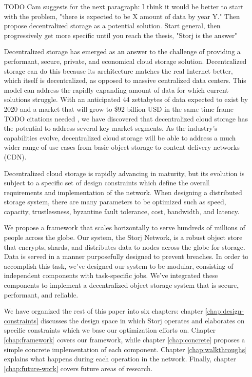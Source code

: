 \documentclass[11pt,fleqn,openany]{book}
\newcommand{\todo}[1]{{\color{red} TODO #1 }}
\begin{document}
\todo{Cam suggests for the next paragraph:
I think it would be better to start with the problem, "there is expected to be X amount of data by year Y." Then propose decentralized storage as a potential solution. Start general, then progressively get more specific until you reach the thesis, "Storj is the answer"
}

Decentralized storage has emerged as an answer to the challenge of
providing a performant, secure, private, and economical cloud storage solution.
Decentralized storage can do this because its architecture matches the real
Internet better, which itself is decentralized, as opposed to massive
centralized data centers. This model can address the rapidly
expanding amount of data for which current solutions struggle.
With an anticipated 44 zettabytes of data expected to exist by 2020 and a
market that will grow to \$92 billion USD in the same time frame
\todo{citations needed}, we have discovered that decentralized cloud storage
has the potential to address several key market segments.
As the industry's capabilities evolve, decentralized cloud
storage will be able to address a much wider range of use cases from basic
object storage to content delivery networks (CDN).

Decentralized cloud storage is rapidly advancing in maturity, but its evolution
is subject to a specific set of design constraints which
define the overall requirements and implementation of
the network. When designing a distributed storage system,
there are many parameters to be optimized such as speed, capacity,
trustlessness, byzantine fault tolerance, cost, bandwidth, and latency.

We propose a framework that scales horizontally to serve hundreds of millions of
people across the globe. Our system, the Storj Network, is a robust object store
that encrypts, shards, and distributes data to nodes across the globe for
storage.
Data is served in a manner purposefully designed to prevent
breaches.
In order to accomplish this task, we've designed our system to be modular,
consisting of independent components with task-specific jobs.
We've integrated these components to implement a decentralized object storage
system that is secure, performant, and reliable.

We have organized the rest of this paper into six
chapters: chapter \ref{chap:design-constraints} discusses the design space
in which Storj operates and elaborates on specific constraints which
we base our optimization efforts on.
Chapter \ref{chap:framework} covers our framework, while chapter
\ref{chap:concrete}
proposes a simple concrete implementation of each component.
Chapter \ref{chap:walkthroughs} explains what happens
during each operation in the network. Finally, chapter
\ref{chap:future-work} covers future areas of research.
\end{document}
